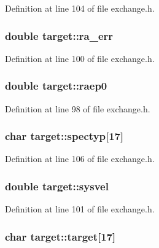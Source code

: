 Definition at line 104 of file exchange.h.

\hypertarget{structtarget_a03fb3d5b5a9fb5a5b1fcb0359a323966}{
\subsubsection[{ra\_\-err}]{\setlength{\rightskip}{0pt plus 5cm}double {\bf target::ra\_\-err}}}
\label{structtarget_a03fb3d5b5a9fb5a5b1fcb0359a323966}


Definition at line 100 of file exchange.h.

\hypertarget{structtarget_a77d7ef62e5734c032fd755c0a6939a01}{
\subsubsection[{raep0}]{\setlength{\rightskip}{0pt plus 5cm}double {\bf target::raep0}}}
\label{structtarget_a77d7ef62e5734c032fd755c0a6939a01}


Definition at line 98 of file exchange.h.

\hypertarget{structtarget_a1d51d318f08839ace902eea3e741ffdf}{
\subsubsection[{spectyp}]{\setlength{\rightskip}{0pt plus 5cm}char {\bf target::spectyp}\mbox{[}17\mbox{]}}}
\label{structtarget_a1d51d318f08839ace902eea3e741ffdf}


Definition at line 106 of file exchange.h.

\hypertarget{structtarget_aca0e34f83749fe6dde307f51783beb5c}{
\subsubsection[{sysvel}]{\setlength{\rightskip}{0pt plus 5cm}double {\bf target::sysvel}}}
\label{structtarget_aca0e34f83749fe6dde307f51783beb5c}


Definition at line 101 of file exchange.h.

\hypertarget{structtarget_a91de5727458e9d952596de3f3deb0e81}{
\subsubsection[{target}]{\setlength{\rightskip}{0pt plus 5cm}char {\bf target::target}\mbox{[}17\mbox{]}}}
\label{structtarget_a91de5727458e9d952596de3f3deb0e81}


